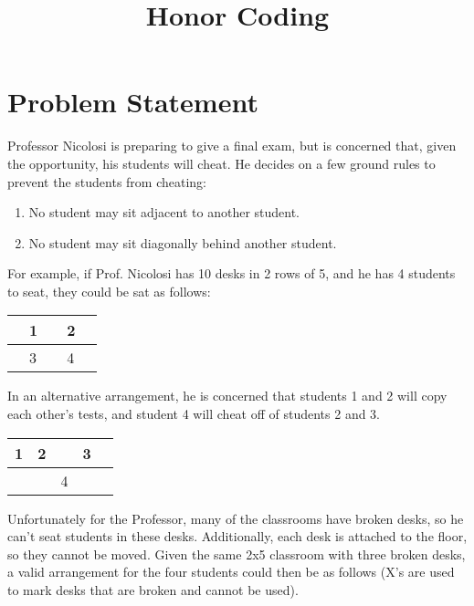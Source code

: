 \documentclass[11pt]{article}
\title{\textbf{Honor Coding}}
\date{}
\begin{document}
\maketitle

\section{Problem Statement}

Professor Nicolosi is preparing to give a final exam, but is concerned that,
given the opportunity, his students will cheat. He decides on a few ground
rules to prevent the students from cheating:
\begin{enumerate}
\item No student may sit adjacent to another student.
\item No student may sit diagonally behind another student.
\end{enumerate}
\smallskip
For example, if Prof. Nicolosi has 10 desks in 2 rows of 5,
and he has 4 students to seat, they could be sat as follows:

\begin{center}
\setlength{\tabcolsep}{8pt}
\renewcommand{\arraystretch}{1.5}
\begin{tabular}{ | m{6pt} | m{6pt} | m{6pt} | m{6pt} | m{6pt} | }
		\hline
 		& 1 & & 2 & \\ \hline
		& 3 & & 4 & \\
 		\hline
\end{tabular}
\end{center}
\smallskip
In an alternative arrangement, he is concerned that students 1 and 2 will copy
each other's tests, and student 4 will cheat off of students 2 and 3.

\begin{center}
\setlength{\tabcolsep}{8pt}
\renewcommand{\arraystretch}{1.5}
\begin{tabular}{ | m{6pt} | m{6pt} | m{6pt} | m{6pt} | m{6pt} | }
		\hline
 		1 & 2 & & 3 & \\ \hline
		& & 4 & & \\
 		\hline
\end{tabular}
\end{center}
\bigskip
Unfortunately for the Professor, many of the classrooms have broken desks,
so he can't seat students in these desks. Additionally, each desk
is attached to the floor, so they cannot be moved. Given the same 2x5 classroom
with three broken desks, a valid arrangement for the four students could then be
as follows (X's are used to mark desks that are broken and cannot be used).
\end{document}
